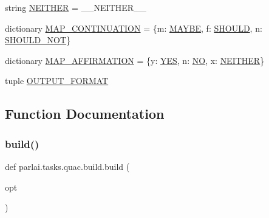 \begin{DoxyCompactItemize}
\item 
string \hyperlink{namespaceparlai_1_1tasks_1_1quac_1_1build_aea3d40b1bffbd55955c5d462803932c1}{N\+E\+I\+T\+H\+ER} = \textquotesingle{}\+\_\+\+\_\+\+N\+E\+I\+T\+H\+E\+R\+\_\+\+\_\+\textquotesingle{}
\item 
dictionary \hyperlink{namespaceparlai_1_1tasks_1_1quac_1_1build_a4c0429a20d4b3f822b92a2897131ee2d}{M\+A\+P\+\_\+\+C\+O\+N\+T\+I\+N\+U\+A\+T\+I\+ON} = \{\textquotesingle{}m\textquotesingle{}\+: \hyperlink{namespaceparlai_1_1tasks_1_1quac_1_1build_a0591761190bee9bc4e39f88d0f374e86}{M\+A\+Y\+BE}, \textquotesingle{}f\textquotesingle{}\+: \hyperlink{namespaceparlai_1_1tasks_1_1quac_1_1build_a5f8e1b371211c16c440b76b8ae3f3af6}{S\+H\+O\+U\+LD}, \textquotesingle{}n\textquotesingle{}\+: \hyperlink{namespaceparlai_1_1tasks_1_1quac_1_1build_af323f9b5375de6cea2bca8b24615a464}{S\+H\+O\+U\+L\+D\+\_\+\+N\+OT}\}
\item 
dictionary \hyperlink{namespaceparlai_1_1tasks_1_1quac_1_1build_ab20c3d8515482b46022a2dbd6b0065a3}{M\+A\+P\+\_\+\+A\+F\+F\+I\+R\+M\+A\+T\+I\+ON} = \{\textquotesingle{}y\textquotesingle{}\+: \hyperlink{namespaceparlai_1_1tasks_1_1quac_1_1build_ae765b76a84d02581f82b38b996795052}{Y\+ES}, \textquotesingle{}n\textquotesingle{}\+: \hyperlink{namespaceparlai_1_1tasks_1_1quac_1_1build_a50beb08d880b27c076327f5a0a26d2e5}{NO}, \textquotesingle{}x\textquotesingle{}\+: \hyperlink{namespaceparlai_1_1tasks_1_1quac_1_1build_aea3d40b1bffbd55955c5d462803932c1}{N\+E\+I\+T\+H\+ER}\}
\item 
tuple \hyperlink{namespaceparlai_1_1tasks_1_1quac_1_1build_af556702b5497614148ac64bc9173d1bb}{O\+U\+T\+P\+U\+T\+\_\+\+F\+O\+R\+M\+AT}
\end{DoxyCompactItemize}


\subsection{Function Documentation}
\mbox{\label{namespaceparlai_1_1tasks_1_1quac_1_1build_a86e9b7d4a167a4dc22e925770ce42824}} 
\subsubsection{\texorpdfstring{build()}{build()}}
{\footnotesize\ttfamily def parlai.\+tasks.\+quac.\+build.\+build (\begin{DoxyParamCaption}\item[{}]{opt }\end{DoxyParamCaption})}



